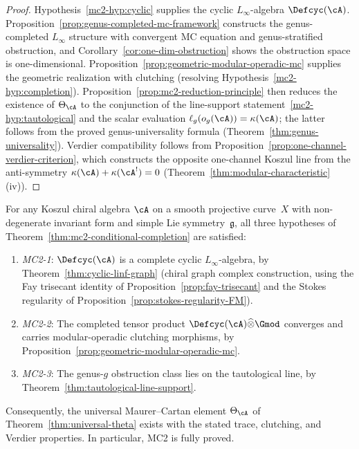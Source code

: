 \begin{proof}
Hypothesis~\ref{mc2-hyp:cyclic} supplies the cyclic
$L_\infty$-algebra $\Defcyc(\cA)$.
Proposition~\ref{prop:genus-completed-mc-framework} constructs the
genus-completed $L_\infty$ structure with convergent MC equation
and genus-stratified obstruction, and
Corollary~\ref{cor:one-dim-obstruction} shows the obstruction space
is one-dimensional.
Proposition~\ref{prop:geometric-modular-operadic-mc} supplies the
geometric realization with clutching
(resolving Hypothesis~\ref{mc2-hyp:completion}).
Proposition~\ref{prop:mc2-reduction-principle} then reduces the
existence of $\Theta_{\cA}$ to the conjunction of the line-support
statement~\ref{mc2-hyp:tautological} and the scalar evaluation
$\ell_g(o_g(\cA)) = \kappa(\cA)$; the latter follows from the
proved genus-universality formula
(Theorem~\ref{thm:genus-universality}).
Verdier compatibility follows from
Proposition~\ref{prop:one-channel-verdier-criterion}, which
constructs the opposite one-channel Koszul line from the
anti-symmetry $\kappa(\cA) + \kappa(\cA^!) = 0$
(Theorem~\ref{thm:modular-characteristic}(iv)).
\end{proof}

\begin{theorem}
\label{thm:mc2-full-resolution}
For any Koszul chiral algebra $\cA$ on a smooth projective
curve~$X$ with non-degenerate invariant form and simple Lie
symmetry~$\mathfrak{g}$, all three hypotheses of
Theorem~\textup{\ref{thm:mc2-conditional-completion}} are satisfied:
\begin{enumerate}[label=\textup{(\roman*)}]
\item \emph{MC2-1}: $\Defcyc(\cA)$ is a complete cyclic
  $L_\infty$-algebra, by
  Theorem~\textup{\ref{thm:cyclic-linf-graph}} \textup{(}chiral
  graph complex construction, using the Fay trisecant identity of
  Proposition~\textup{\ref{prop:fay-trisecant}} and the Stokes
  regularity of
  Proposition~\textup{\ref{prop:stokes-regularity-FM}}\textup{)}.
\item \emph{MC2-2}: The completed tensor product
  $\Defcyc(\cA) \widehat{\otimes} \Gmod$ converges and carries
  modular-operadic clutching morphisms, by
  Proposition~\textup{\ref{prop:geometric-modular-operadic-mc}}.
\item \emph{MC2-3}: The genus-$g$ obstruction class lies on the
  tautological line, by
  Theorem~\textup{\ref{thm:tautological-line-support}}.
\end{enumerate}
Consequently, the universal Maurer--Cartan element
$\Theta_{\cA}$ of
Theorem~\textup{\ref{thm:universal-theta}} exists with the
stated trace, clutching, and Verdier properties.
In particular, \textup{MC2} is fully proved.
\end{theorem}

